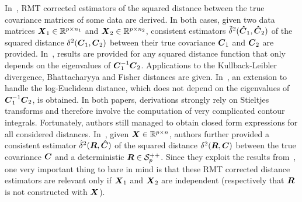 \documentclass{article}
\theoremstyle{plain}
\theoremstyle{definition}
\theoremstyle{remark}
\begin{document}
In~\cite{couillet2019random,pereira2023consistent}, RMT corrected estimators of the squared distance between the true covariance matrices of some data are derived.
In both cases, given two data matrices $\boldsymbol{X}_1\in\mathbb{R}^{p\times n_1}$ and $\boldsymbol{X}_2\in\mathbb{R}^{p\times n_2}$, consistent estimators $\tilde{\delta}^2(\boldsymbol{\hat{C}}_1,\boldsymbol{\hat{C}}_2)$ of the squared distance $\delta^2(\boldsymbol{C}_1,\boldsymbol{C}_2)$ between their true covariance $\boldsymbol{C}_1$ and $\boldsymbol{C}_2$ are provided.
In~\cite{couillet2019random}, results are provided for any squared distance function that only depends on the eigenvalues of $\boldsymbol{C}_1^{-1}\boldsymbol{C}_2$.
Applications to the Kullback-Leibler divergence, Bhattacharyya and Fisher distances are given.
In~\cite{pereira2023consistent}, an extension to handle the log-Euclidean distance, which does not depend on the eigenvalues of $\boldsymbol{C}_1^{-1}\boldsymbol{C}_2$, is obtained.
In both papers, derivations strongly rely on Stieltjes transforms and therefore involve the computation of very complicated contour integrals.
Fortunately, authors still managed to obtain closed form expressions for all considered distances.
%
In~\cite{couillet2019random}, given $\boldsymbol{X}\in\mathbb{R}^{p\times n}$, authors further provided a consistent estimator $\hat{\delta}^2(\boldsymbol{R},\boldsymbol{\hat{C}})$ of the squared distance $\delta^2(\boldsymbol{R},\boldsymbol{C})$ between the true covariance $\boldsymbol{C}$ and a deterministic $\boldsymbol{R}\in\mathcal{S}^{++}_{p}$. 
%
Since they exploit the results from~\cite{silverstein1995empirical}, one very important thing to bare in mind is that these RMT corrected distance estimators are relevant only if $\boldsymbol{X}_1$ and $\boldsymbol{X}_2$ are independent (respectively that $\boldsymbol{R}$ is not constructed with $\boldsymbol{X}$).
\end{document}
